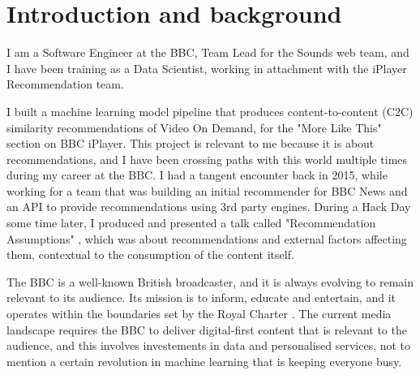 
\section{Introduction and background}

I am a Software Engineer at the BBC, Team Lead for the Sounds web team, and I have been training as a Data Scientist,
working in attachment with the iPlayer Recommendation team.

I built a machine learning model pipeline that produces content-to-content (C2C) similarity recommendations
of Video On Demand, for the "More Like This" section \cite{MoreLikeBluey} on BBC iPlayer.
This project is relevant to me because it is about recommendations, and I have been crossing paths with this world
multiple times during my career at the BBC.
I had a tangent encounter back in 2015, while working for a team that was building
an initial recommender for BBC News and an API to provide recommendations using 3rd party engines.
During a Hack Day some time later, I produced and presented a talk called
"Recommendation Assumptions" \cite{RecsAssumptions}, which was about recommendations and external factors affecting
them, contextual to the consumption of the content itself.

The BBC is a well-known British broadcaster, and it is always evolving to remain relevant to its audience. Its mission
is to inform, educate and entertain, and it operates within the boundaries set by the Royal Charter \cite{RoyalCharterBBC}.
The current media landscape requires the BBC to deliver digital-first content that is relevant to the audience,
and this involves investements in data and personalised services, not to mention a certain revolution in machine learning
that is keeping everyone busy.
